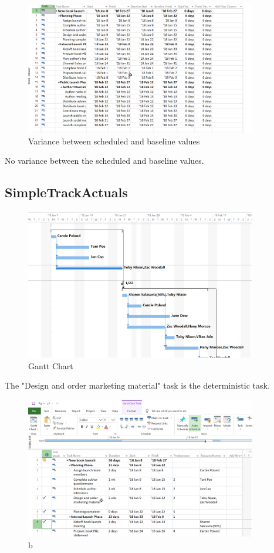 \documentclass[runningheads]{llncs}
\begin{document}
\begin{figure}[H]
    \centering
    \includegraphics[width=0.9\textwidth]{./image/t2f2}
    \caption{Variance between scheduled and baseline values}
\end{figure}

No variance between the scheduled and baseline values.

\subsection*{SimpleTrackActuals}
\begin{figure}[H]
    \centering
    \includegraphics[width=0.9\textwidth]{./image/t3f1}
    \caption{Gantt Chart}
\end{figure}

The "Design and order marketing material" task is the deterministic task.

\begin{figure}[H]
    \centering
    \includegraphics[width=0.9\textwidth]{./image/t3f2}
    \caption{b}
\end{figure}
\end{document}
